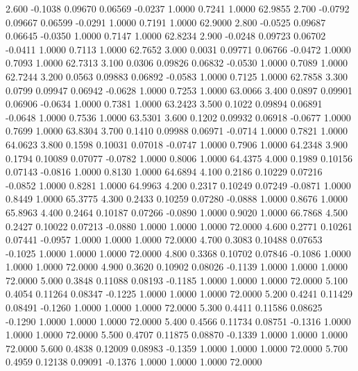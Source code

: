    2.600  -0.1038   0.09670   0.06569  -0.0237   1.0000   0.7241   1.0000  62.9855
   2.700  -0.0792   0.09667   0.06599  -0.0291   1.0000   0.7191   1.0000  62.9000
   2.800  -0.0525   0.09687   0.06645  -0.0350   1.0000   0.7147   1.0000  62.8234
   2.900  -0.0248   0.09723   0.06702  -0.0411   1.0000   0.7113   1.0000  62.7652
   3.000   0.0031   0.09771   0.06766  -0.0472   1.0000   0.7093   1.0000  62.7313
   3.100   0.0306   0.09826   0.06832  -0.0530   1.0000   0.7089   1.0000  62.7244
   3.200   0.0563   0.09883   0.06892  -0.0583   1.0000   0.7125   1.0000  62.7858
   3.300   0.0799   0.09947   0.06942  -0.0628   1.0000   0.7253   1.0000  63.0066
   3.400   0.0897   0.09901   0.06906  -0.0634   1.0000   0.7381   1.0000  63.2423
   3.500   0.1022   0.09894   0.06891  -0.0648   1.0000   0.7536   1.0000  63.5301
   3.600   0.1202   0.09932   0.06918  -0.0677   1.0000   0.7699   1.0000  63.8304
   3.700   0.1410   0.09988   0.06971  -0.0714   1.0000   0.7821   1.0000  64.0623
   3.800   0.1598   0.10031   0.07018  -0.0747   1.0000   0.7906   1.0000  64.2348
   3.900   0.1794   0.10089   0.07077  -0.0782   1.0000   0.8006   1.0000  64.4375
   4.000   0.1989   0.10156   0.07143  -0.0816   1.0000   0.8130   1.0000  64.6894
   4.100   0.2186   0.10229   0.07216  -0.0852   1.0000   0.8281   1.0000  64.9963
   4.200   0.2317   0.10249   0.07249  -0.0871   1.0000   0.8449   1.0000  65.3775
   4.300   0.2433   0.10259   0.07280  -0.0888   1.0000   0.8676   1.0000  65.8963
   4.400   0.2464   0.10187   0.07266  -0.0890   1.0000   0.9020   1.0000  66.7868
   4.500   0.2427   0.10022   0.07213  -0.0880   1.0000   1.0000   1.0000  72.0000
   4.600   0.2771   0.10261   0.07441  -0.0957   1.0000   1.0000   1.0000  72.0000
   4.700   0.3083   0.10488   0.07653  -0.1025   1.0000   1.0000   1.0000  72.0000
   4.800   0.3368   0.10702   0.07846  -0.1086   1.0000   1.0000   1.0000  72.0000
   4.900   0.3620   0.10902   0.08026  -0.1139   1.0000   1.0000   1.0000  72.0000
   5.000   0.3848   0.11088   0.08193  -0.1185   1.0000   1.0000   1.0000  72.0000
   5.100   0.4054   0.11264   0.08347  -0.1225   1.0000   1.0000   1.0000  72.0000
   5.200   0.4241   0.11429   0.08491  -0.1260   1.0000   1.0000   1.0000  72.0000
   5.300   0.4411   0.11586   0.08625  -0.1290   1.0000   1.0000   1.0000  72.0000
   5.400   0.4566   0.11734   0.08751  -0.1316   1.0000   1.0000   1.0000  72.0000
   5.500   0.4707   0.11875   0.08870  -0.1339   1.0000   1.0000   1.0000  72.0000
   5.600   0.4838   0.12009   0.08983  -0.1359   1.0000   1.0000   1.0000  72.0000
   5.700   0.4959   0.12138   0.09091  -0.1376   1.0000   1.0000   1.0000  72.0000
